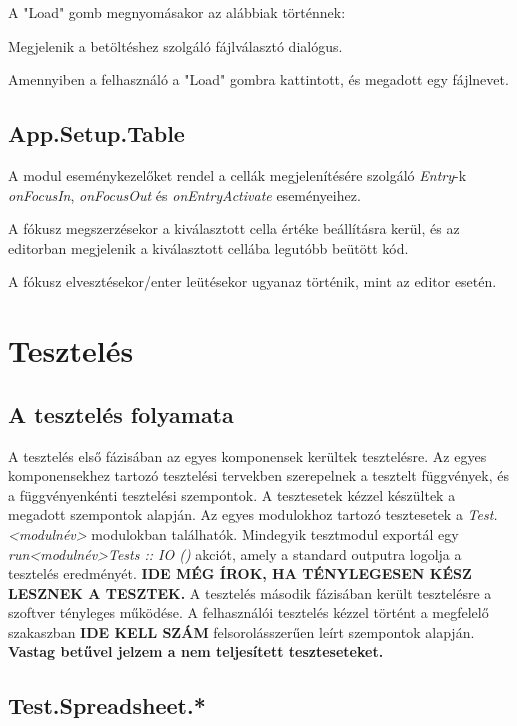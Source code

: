 A "Load" gomb megnyomásakor az alábbiak történnek:
\begin{compactenum}
	\item Megjelenik a betöltéshez szolgáló fájlválasztó dialógus.
	\item Amennyiben a felhasználó a "Load" gombra kattintott, és megadott egy fájlnevet.
\end{compactenum}

\subsection{App.Setup.Table}

A modul eseménykezelőket rendel a cellák megjelenítésére szolgáló \textit{Entry}-k \textit{onFocusIn}, \textit{onFocusOut} és \textit{onEntryActivate} eseményeihez.

A fókusz megszerzésekor a kiválasztott cella értéke beállításra kerül, 
és az editorban megjelenik a kiválasztott cellába legutóbb beütött kód.

A fókusz elvesztésekor/enter leütésekor ugyanaz történik, mint az editor esetén.
\section{Tesztelés}

\subsection{A tesztelés folyamata}

A tesztelés első fázisában az egyes komponensek kerültek tesztelésre. Az egyes komponensekhez tartozó tesztelési tervekben szerepelnek a tesztelt függvények, és a függvényenkénti tesztelési szempontok. A tesztesetek kézzel készültek a megadott szempontok alapján. 
Az egyes modulokhoz tartozó tesztesetek a \textit{Test.<modulnév>} modulokban találhatók. Mindegyik tesztmodul exportál egy \textit{run<modulnév>Tests :: IO ()} akciót, amely a standard outputra logolja a tesztelés eredményét. \textbf{IDE MÉG ÍROK, HA TÉNYLEGESEN KÉSZ LESZNEK A TESZTEK.}
A tesztelés második fázisában került tesztelésre a szoftver tényleges működése. A felhasználói tesztelés kézzel történt a megfelelő szakaszban \textbf{IDE KELL SZÁM} felsorolásszerűen leírt szempontok alapján. \textbf{Vastag betűvel jelzem a nem teljesített teszteseteket.}

\subsection{Test.Spreadsheet.*}

